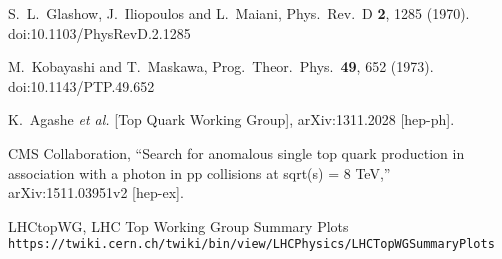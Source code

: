 \documentclass[12pt,letterpaper]{article}
\begin{document}
\begin{thebibliography}{9}
  S.~L.~Glashow, J.~Iliopoulos and L.~Maiani,
  Phys.\ Rev.\ D {\bf 2}, 1285 (1970).
  doi:10.1103/PhysRevD.2.1285

  M.~Kobayashi and T.~Maskawa,
  Prog.\ Theor.\ Phys.\  {\bf 49}, 652 (1973).
  doi:10.1143/PTP.49.652

  K.~Agashe {\it et al.} [Top Quark Working Group],
  arXiv:1311.2028 [hep-ph].

  CMS Collaboration,
  ``Search for anomalous single top quark production in association with a photon in pp collisions at sqrt(s) = 8 TeV,''
  arXiv:1511.03951v2 [hep-ex].

LHCtopWG, LHC Top Working Group Summary Plots
\\\texttt{https://twiki.cern.ch/twiki/bin/view/LHCPhysics/LHCTopWGSummaryPlots}
\end{thebibliography}
\end{document}
